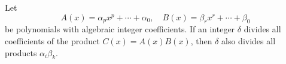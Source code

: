 Let
$$A(x) = \alpha_p x^p + \cdots + \alpha_0, \quad B(x) = \beta_r x^r + \cdots + \beta_0$$
be polynomials with algebraic integer coefficients. If an integer $\delta$ divides all coefficients of the product $C(x) = A(x)B(x)$, then $\delta$ also divides all products $\alpha_i \beta_k$.
